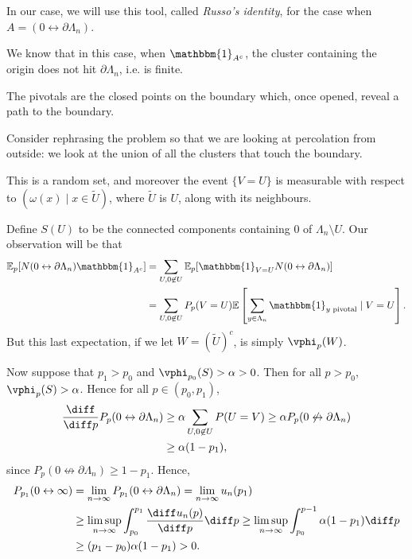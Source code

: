 \documentclass[12pt]{article}
\begin{document}

In our case, we will use this tool, called \emph{Russo's identity}, for the case when $A = (0 \leftrightarrow \partial \Lambda_n)$.

\begin{proofbox}
	We know that in this case, when $\mathbbm{1}_{A^{c}}$, the cluster containing the origin does not hit $\partial \Lambda_n$, i.e. is finite.

	The pivotals are the closed points on the boundary which, once opened, reveal a path to the boundary.

	Consider rephrasing the problem so that we are looking at percolation from outside: we look at the union of all the clusters that touch the boundary.

	This is a random set, and moreover the event $\{V = U\}$ is measurable with respect to $(\omega(x) \mid x \in \tilde U)$, where $\tilde U$ is $U$, along with its neighbours.

	Define $S(U)$ to be the connected components containing $0$ of $\Lambda_n \setminus U$. Our observation will be that
	\begin{align*}
		\mathbb{E}_p[N(0 \leftrightarrow \partial \Lambda_n) \mathbbm{1}_{A^{c}}] &= \sum_{U, 0 \not \in U} \mathbb{E}_p[\mathbbm{1}_{V = U} N(0 \leftrightarrow \partial \Lambda_n)] \\
											  &= \sum_{U, 0 \not \in U} P_p(V = U) \mathbb{E}\left[ \sum_{y \in \Lambda_n} \mathbbm{1}_{y \text{ pivotal}} \mid V = U \right].
	\end{align*}
	But this last expectation, if we let $W = (\tilde U)^{c}$, is simply $\vphi_p(W)$.

	Now suppose that $p_1 > p_0$ and $\vphi_{p_0}(S) > \alpha > 0$. Then for all $p > p_0$, $\vphi_p(S) > \alpha$. Hence for all $p \in (p_0, p_1)$,
	\begin{align*}
		\frac{\diff}{\diff p}P_p(0 \leftrightarrow \partial \Lambda_n) &\geq \alpha \sum_{U, 0 \not \in U} P(U = V) \geq \alpha P_p(0 \not \leftrightarrow \partial \Lambda_n) \\
									       & \geq \alpha (1 - p_1),
	\end{align*}
	since $P_p(0 \not \leftrightarrow \partial \Lambda_n) \geq 1 - p_1$. Hence,
	\begin{align*}
		P_{p_1}(0 \leftrightarrow \infty) &= \lim_{n \to \infty} P_{p_1}(0 \leftrightarrow \partial \Lambda_n) = \lim_{n \to \infty}u_n(p_1) \\
						  &\geq \limsup_{n \to \infty} \int_{p_0}^{p_1} \frac{\diff u_n(p)}{\diff p} \diff p \geq \limsup_{n \to \infty} \int_{p_0}^{p-1} \alpha (1 - p_1) \diff p \\
						  &\geq (p_1 - p_0) \alpha (1 - p_1) > 0.
	\end{align*}
\end{proofbox}
\end{document}
